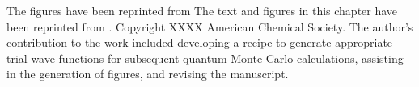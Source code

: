 The figures have been reprinted from \cite{10.1021/acs.jpclett.8b02733}
The text and figures in this chapter have been reprinted from \cite{10.1021/acs.jpclett.8b02733}.
Copyright XXXX American Chemical Society. %
The author's contribution to the work included developing a recipe to generate appropriate trial wave functions for subsequent quantum Monte Carlo calculations, assisting in the generation of figures, and revising the manuscript.
